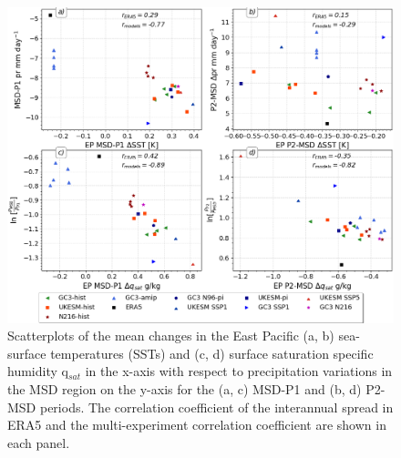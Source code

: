 \begin{figure}[t!]
\includegraphics[width=\linewidth]{figures/sst_scatter_f.png}
\caption[Scatter plot of SST changes]{Scatterplots of the mean changes in the East Pacific (a, b) sea-surface temperatures (SSTs) and (c, d) surface saturation specific humidity q$_{sat}$ in the x-axis with respect to precipitation variations in the MSD region on the y-axis for the (a, c) MSD-P1 and (b, d) P2-MSD periods.  The correlation coefficient of the interannual spread in ERA5 and the multi-experiment correlation coefficient are shown in each panel.   }
\label{fig:var_sst_lhf_scatter}
\end{figure}


